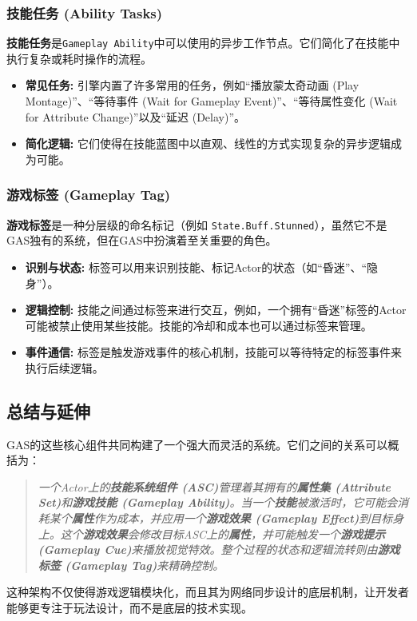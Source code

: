 \documentclass[math,code,10pt,CJKmath]{amznotes}
\begin{document}
\subsubsection{技能任务 (Ability Tasks)}
\textbf{技能任务}是\texttt{Gameplay Ability}中可以使用的异步工作节点。它们简化了在技能中执行复杂或耗时操作的流程。
\begin{itemize}
    \item \textbf{常见任务:} 引擎内置了许多常用的任务，例如“播放蒙太奇动画 (Play Montage)”、“等待事件 (Wait for Gameplay Event)”、“等待属性变化 (Wait for Attribute Change)”以及“延迟 (Delay)”。
    \item \textbf{简化逻辑:} 它们使得在技能蓝图中以直观、线性的方式实现复杂的异步逻辑成为可能。
\end{itemize}

\subsubsection{游戏标签 (Gameplay Tag)}
\textbf{游戏标签}是一种分层级的命名标记（例如 \texttt{State.Buff.Stunned}），虽然它不是GAS独有的系统，但在GAS中扮演着至关重要的角色。
\begin{itemize}
    \item \textbf{识别与状态:} 标签可以用来识别技能、标记Actor的状态（如“昏迷”、“隐身”）。
    \item \textbf{逻辑控制:} 技能之间通过标签来进行交互，例如，一个拥有“昏迷”标签的Actor可能被禁止使用某些技能。技能的冷却和成本也可以通过标签来管理。
    \item \textbf{事件通信:} 标签是触发游戏事件的核心机制，技能可以等待特定的标签事件来执行后续逻辑。
\end{itemize}

\subsection{总结与延伸}
GAS的这些核心组件共同构建了一个强大而灵活的系统。它们之间的关系可以概括为：
\begin{quote}
		\itshape
    一个Actor上的\textbf{技能系统组件 (ASC)}管理着其拥有的\textbf{属性集 (Attribute Set)}和\textbf{游戏技能 (Gameplay Ability)}。当一个\textbf{技能}被激活时，它可能会消耗某个\textbf{属性}作为成本，并应用一个\textbf{游戏效果 (Gameplay Effect)}到目标身上。这个\textbf{游戏效果}会修改目标ASC上的\textbf{属性}，并可能触发一个\textbf{游戏提示 (Gameplay Cue)}来播放视觉特效。整个过程的状态和逻辑流转则由\textbf{游戏标签 (Gameplay Tag)}来精确控制。
\end{quote}
这种架构不仅使得游戏逻辑模块化，而且其为网络同步设计的底层机制，让开发者能够更专注于玩法设计，而不是底层的技术实现。
\end{document}
